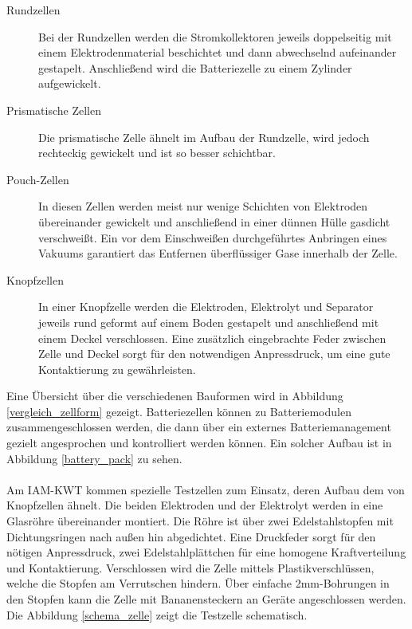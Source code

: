\documentclass[a4paper, 11pt, headsepline,footsepline,twoside,abstract]{scrbook}
\begin{document}
\begin{description}
\item[Rundzellen] Bei der Rundzellen werden die Stromkollektoren jeweils doppelseitig mit einem Elektrodenmaterial beschichtet und dann abwechselnd aufeinander gestapelt. Anschließend wird die Batteriezelle zu einem Zylinder aufgewickelt.
\item[Prismatische Zellen] Die prismatische Zelle ähnelt im Aufbau der Rundzelle, wird jedoch rechteckig gewickelt und ist so besser schichtbar.
\item[Pouch-Zellen] In diesen Zellen werden meist nur wenige Schichten von Elektroden übereinander gewickelt und anschließend in einer dünnen Hülle gasdicht verschweißt. Ein vor dem Einschweißen durchgeführtes Anbringen eines Vakuums garantiert das Entfernen überflüssiger Gase innerhalb der Zelle.
\item[Knopfzellen] In einer Knopfzelle werden die Elektroden, Elektrolyt und Separator jeweils rund geformt auf einem Boden gestapelt und anschließend mit einem Deckel verschlossen. Eine zusätzlich eingebrachte Feder zwischen Zelle und Deckel sorgt für den notwendigen Anpressdruck, um eine gute Kontaktierung zu gewährleisten.
\end{description}
Eine Übersicht über die verschiedenen Bauformen wird in Abbildung \ref{vergleich_zellform} gezeigt. Batteriezellen können zu Batteriemodulen zusammengeschlossen werden, die dann über ein externes Batteriemanagement gezielt angesprochen und kontrolliert werden können. Ein solcher Aufbau ist in Abbildung \ref{battery_pack} zu sehen.
\\\\
Am IAM-KWT kommen spezielle Testzellen zum Einsatz, deren Aufbau dem von Knopfzellen ähnelt. Die beiden Elektroden und der Elektrolyt werden in eine Glasröhre übereinander montiert. Die Röhre ist über zwei Edelstahlstopfen mit Dichtungsringen nach außen hin abgedichtet. Eine Druckfeder sorgt für den nötigen Anpressdruck, zwei Edelstahlplättchen für eine homogene Kraftverteilung und Kontaktierung. Verschlossen wird die Zelle mittels Plastikverschlüssen, welche die Stopfen am Verrutschen hindern. Über einfache 2mm-Bohrungen in den Stopfen kann die Zelle mit Bananensteckern an Geräte angeschlossen werden. Die Abbildung \ref{schema_zelle} zeigt die Testzelle schematisch.
\end{document}
